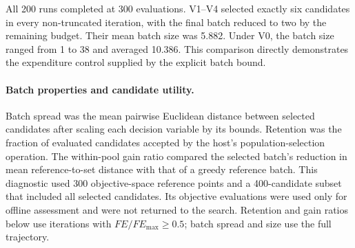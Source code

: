 \documentclass[final,5p,times,twocolumn]{elsarticle}
\begin{document}
All 200 runs completed at 300 evaluations. V1--V4 selected exactly six
candidates in every non-truncated iteration, with the final batch
reduced to two by the remaining budget. Their mean batch size was
5.882. Under V0, the batch size ranged from 1 to 38 and averaged 10.386.
This comparison directly demonstrates the expenditure control supplied
by the explicit batch bound.

\paragraph{Batch properties and candidate utility.}
Batch spread was the mean pairwise Euclidean distance between selected
candidates after scaling each decision variable by its bounds. Retention was the fraction of evaluated candidates accepted
by the host's population-selection operation. The within-pool gain
ratio compared the selected batch's reduction in mean reference-to-set
distance with that of a greedy reference batch. This diagnostic used
300 objective-space reference points and a 400-candidate subset that
included all selected candidates. Its objective evaluations were used
only for offline assessment and were not returned to the search.
Retention and gain ratios below use iterations with
$FE/FE_{\max}\geq0.5$; batch spread and size use the full trajectory.
\end{document}
